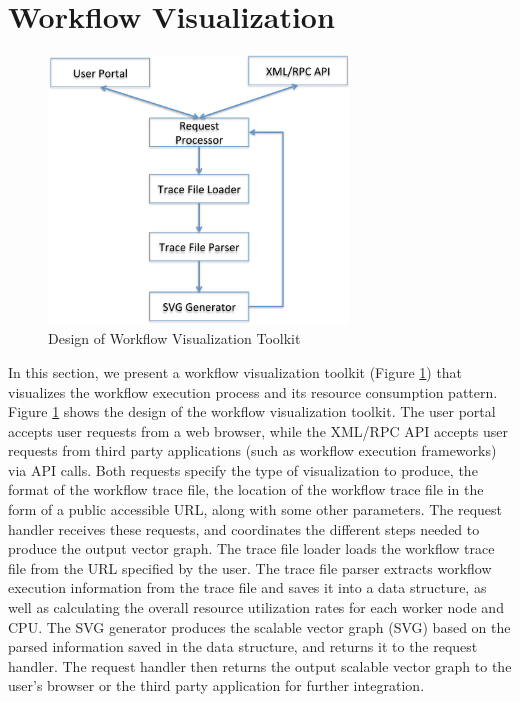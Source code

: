 \section{Workflow Visualization}
\label{v1_sec:visualization}

\begin{figure}[t!]
\centering
\includegraphics[width=8cm]{toolkit}
\caption{Design of Workflow Visualization Toolkit}
	\label{fig:toolkit}
\end{figure}



In this section, we present a workflow visualization toolkit (Figure \ref{fig:toolkit}) that visualizes the workflow execution process and its resource consumption pattern. Figure \ref{fig:toolkit} shows the design of the workflow visualization toolkit. The user portal accepts user requests from a web browser, while the XML/RPC API accepts user requests from third party applications (such as workflow execution frameworks) via API calls. Both requests specify the type of visualization to produce, the format of the workflow trace file, the location of the workflow trace file in the form of a public accessible URL, along with some other parameters. The request handler receives these requests, and coordinates the different steps needed to produce the output vector graph. The trace file loader loads the workflow trace file from the URL specified by the user. The trace file parser extracts workflow execution information from the trace file and saves it into a data structure, as well as calculating the overall resource utilization rates for each worker node and CPU. The SVG generator produces the scalable vector graph (SVG) based on the parsed information saved in the data structure, and returns it to the request handler. The request handler then returns the output scalable vector graph to the user's browser or the third party application for further integration.

